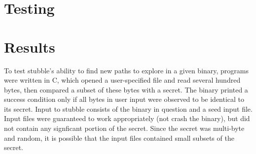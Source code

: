\documentclass[11pt,expanded,copyright]{fsuthesis}
\begin{document}





\section{Testing}

\section{Results}

To test stubble's ability to find new paths to explore in a given binary, programs were written in C, which opened a user-specified file and read several hundred bytes, then compared a subset of these bytes with a secret. The binary printed a success condition only if all bytes in user input were observed to be identical to its secret. Input to stubble consists of the binary in question and a seed input file. Input files were guaranteed to work appropriately (not crash the binary), but did not contain any signficant portion of the secret. Since the secret was multi-byte and random, it is possible that the input files contained small subsets of the secret.
\end{document}
